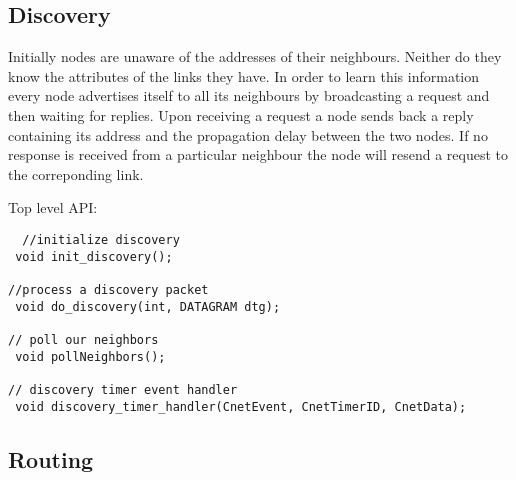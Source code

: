 \documentclass[11pt,a4paper,oneside]{report}
\begin{document}
\subsection*{Discovery}
Initially nodes are unaware of the addresses of their neighbours. Neither do they know the
attributes of the links they have. In order to learn this information every node advertises
itself to all its neighbours by broadcasting a request and then waiting for replies. Upon receiving 
a request a node sends back a reply containing its address and the propagation delay between the
two nodes. If no response is received from a particular neighbour the node will resend a request to the 
correponding link. 
    
Top level API: 
  \begin{lstlisting}
  //initialize discovery
 void init_discovery();

//process a discovery packet
 void do_discovery(int, DATAGRAM dtg);

// poll our neighbors
 void pollNeighbors();

// discovery timer event handler
 void discovery_timer_handler(CnetEvent, CnetTimerID, CnetData);
\end{lstlisting}
\subsection*{Routing}
\end{document}
